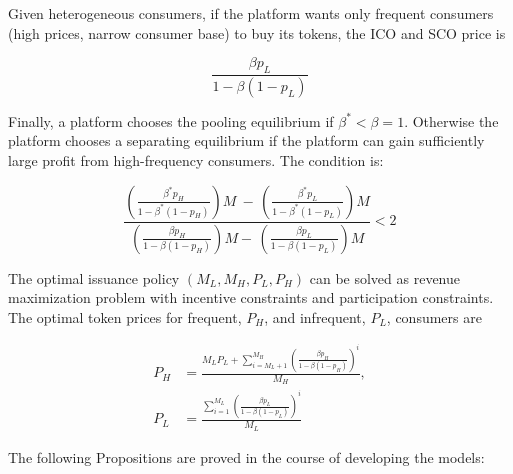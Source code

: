 Given heterogeneous consumers, if the platform wants only frequent consumers (high prices, narrow consumer base) to buy its tokens, the ICO and SCO price is 

\begin{equation}
    \frac{\beta p_{L}}{1-\beta(1-p_{L})}
\end{equation}

Finally, a platform chooses the pooling equilibrium if $\beta^{*} < \beta = 1$. Otherwise the platform chooses a separating equilibrium if the platform can gain sufficiently large profit from high-frequency consumers. The condition is:

\begin{equation}
    \frac{\left(\frac{\beta^{*}p_{H}}{1\!-\!\beta^{*}(1\!-\!p_{H})}\right){M}\ -\,\left(\frac{\beta^{*}p_{L}}{1\!-\!\beta^{*}(1\!-\!p_{L})}\right){M}}
    {\left(\frac{\beta p_{H}}{1-\beta(1\!-\!p_{H})}\right)M-\,\left(\frac{\beta p_{L}}{1\!-\!\beta(1\!-\!p_{L})}\right)M}
    < 2
\end{equation}

The optimal issuance policy $(M_L, M_H, P_L, P_H )$ can be solved as revenue maximization problem with incentive constraints and participation constraints.  The optimal token prices for frequent, $P_H$, and infrequent, $P_L$, consumers are

\begin{align}
    P_{H} &= \frac{M_{L}P_{L}+\sum_{i=M_{L}+1}^{M_{H}}(\frac{\beta p_{H}}{1-\beta(1-p_{H})})^{i}}{M_{H}},\\
    P_{L} &= \frac{\sum_{i=1}^{M_{L}}(\frac{\beta p_{L}}{1-\beta(1-p_{L})})^{i}}{M_{L}}
\end{align}

The following Propositions are proved in the course of developing the models:

